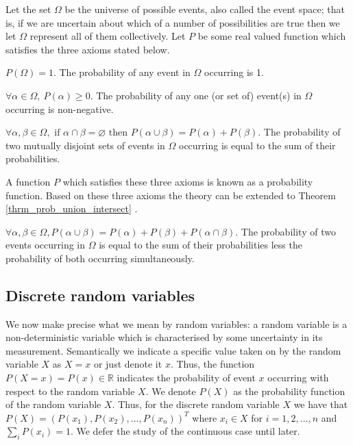 Let the set $\Omega$ be the universe of possible events, also called the event space; that is, if we are uncertain about which of a number of possibilities are true then we let $\Omega$ represent all of them collectively. Let $P$ be some real valued function which satisfies the three axioms stated below.
\begin{ax}
$P(\Omega) = 1$. The probability of any event in $\Omega$ occurring is 1.
\end{ax}
\begin{ax}
$\forall \alpha \in \Omega,~P(\alpha) \geq 0$. The probability of any one (or set of) event(s) in $\Omega$ occurring is non-negative. 
\end{ax}
\begin{ax}
$\forall \alpha, \beta \in \Omega,\text{ if } \alpha \cap \beta = \varnothing \text{ then } P(\alpha \cup \beta) = P(\alpha) + P(\beta)$. The probability of two mutually disjoint sets of events in $\Omega$ occurring is equal to the sum of their probabilities.
\end{ax}
A function $P$ which satisfies these three axioms is known as a probability function. Based on these three axioms the theory can be extended to Theorem \ref{thrm_prob_union_intersect} \cite{koller}.
\begin{thrm}
$\forall \alpha, \beta \in \Omega, P(\alpha \cup \beta) = P(\alpha) + P(\beta) + P(\alpha \cap \beta)$. The probability of two events occurring in $\Omega$ is equal to the sum of their probabilities less the probability of both occurring simultaneously.
\label{thrm_prob_union_intersect}
\end{thrm}

\subsection{Discrete random variables}

We now make precise what we mean by random variables: a random variable is a non-deterministic variable which is characterised by some uncertainty in its measurement. Semantically we indicate a specific value taken on by the random variable $X$ as $X=x$ or just denote it $x$. Thus, the function $P(X=x)=P(x) \in \mathbb{R}$ indicates the probability of event $x$ occurring with respect to the random variable $X$. We denote $P(X)$ as the probability function of the random variable $X$. Thus, for the discrete random variable $X$ we have that $P(X)=(P(x_1),P(x_2),...,P(x_n))^T$ where $x_i \in X$ for $i=1,2,..., n$ and $\sum_i P(x_i) =1$. We defer the study of the continuous case until later.

